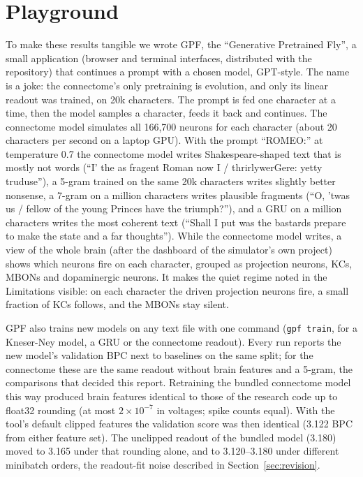 \documentclass[conference]{IEEEtran}
\begin{document}
\section{Playground}
To make these results tangible we wrote GPF, the ``Generative Pretrained
Fly'', a small application (browser and terminal interfaces, distributed with the
repository) that continues a prompt with a chosen model, GPT-style. The name is a joke: the connectome's
only pretraining is evolution, and only its linear readout was trained, on 20k
characters. The prompt is fed one character at a time, then the
model samples a character, feeds it back and continues. The connectome model
simulates all 166{,}700 neurons for each character (about 20 characters per
second on a laptop GPU). With the prompt ``ROMEO:'' at temperature 0.7 the
connectome model writes Shakespeare-shaped text that is mostly not words
(``I' the as fragent Roman now I / thrirlywerGere: yetty truduse''), a 5-gram
trained on the same 20k characters writes slightly better nonsense, a 7-gram
on a million characters writes plausible fragments (``O, 'twas us / fellow
of the young Princes have the triumph?''), and a GRU on a million characters
writes the most coherent text (``Shall I put was the bastards prepare to make
the state and a far thoughts''). While the connectome model writes, a view of
the whole brain (after the dashboard of the simulator's own project) shows which
neurons fire on each character, grouped as projection neurons, KCs, MBONs and
dopaminergic neurons. It makes the quiet regime noted in the Limitations
visible: on each character the driven projection neurons fire, a small
fraction of KCs follows, and the MBONs stay silent.

GPF also trains new models on any text file with one command (\texttt{gpf train},
for a Kneser-Ney model, a GRU or the connectome readout). Every run reports the
new model's validation BPC next to baselines on the same split; for the
connectome these are the same readout without brain features and a 5-gram, the
comparisons that decided this report. Retraining the bundled connectome model
this way produced brain features identical to those of the research code up to
float32 rounding (at most $2\times10^{-7}$ in voltages; spike counts equal). With
the tool's default clipped features the validation score was then identical
(3.122 BPC from either feature set). The unclipped readout of the bundled model
(3.180) moved to 3.165 under that rounding alone, and to 3.120--3.180 under
different minibatch orders, the readout-fit noise described in
Section~\ref{sec:revision}.
\end{document}
